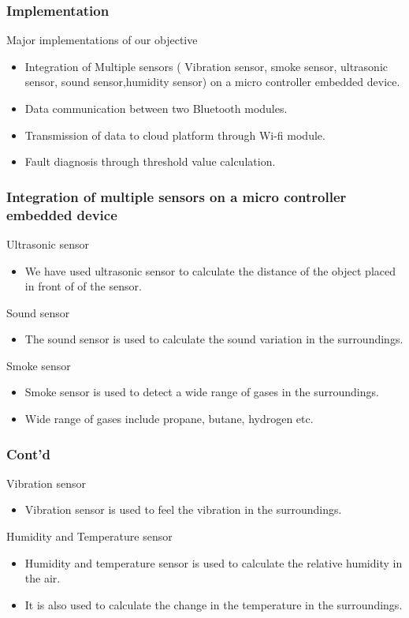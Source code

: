 \documentclass{beamer}
\begin{document}
\begin{frame}\frametitle{Implementation}
\item Major implementations of our objective 
\begin{itemize}
\item Integration of Multiple sensors ( Vibration sensor, smoke sensor, ultrasonic sensor, sound sensor,humidity sensor) on a micro controller embedded device.
\item Data communication between two Bluetooth modules.
\item Transmission of data to cloud platform through Wi-fi module.
\item Fault diagnosis through threshold value calculation.
\end{itemize}
\end{frame}
\begin{frame}\frametitle{Integration of multiple sensors on a micro controller embedded device}
\item Ultrasonic sensor
\begin{itemize}
\item We have used ultrasonic sensor to calculate the distance of the object placed in front of of the sensor.
\end{itemize}
\item Sound sensor
\begin{itemize}
    \item The sound sensor is used to calculate the sound variation in the surroundings.
\end{itemize}
\item Smoke  sensor
\begin{itemize}
\item Smoke sensor is used to detect a wide range of gases in the surroundings.
\item Wide range of gases include propane, butane, hydrogen etc.
\end{itemize}
\end{frame}
 \begin{frame}\frametitle{Cont'd}
 \item Vibration sensor
\begin{itemize}
    \item Vibration sensor is used to feel the vibration in the surroundings. 
    \end{itemize}
    \item Humidity and Temperature sensor
    \begin{itemize}
        \item Humidity and temperature sensor is used to calculate the relative humidity in the air.
        \item It is also used to calculate the change in the temperature in the surroundings.
    \end{itemize}
\end{frame}
\end{document}
